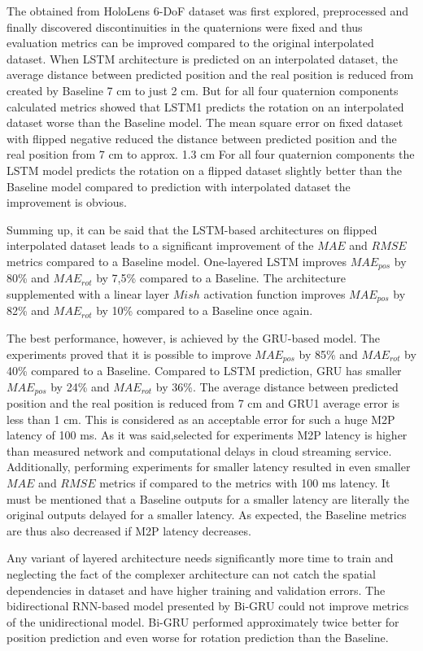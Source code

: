 The obtained from HoloLens 6-DoF dataset was first explored, preprocessed and finally discovered discontinuities in the quaternions were fixed and thus evaluation metrics can be improved compared to the original interpolated dataset. When LSTM architecture is predicted on an interpolated dataset, the average distance between predicted position and the real position is reduced from created by Baseline 7 cm to just 2 cm. But for all four quaternion components calculated metrics showed that LSTM1 predicts the rotation on an interpolated dataset worse than the Baseline model. The mean square error on fixed dataset with flipped negative reduced the distance between predicted position and the real position from 7 cm to approx. 1.3 cm For all four quaternion components the LSTM model predicts the rotation on a flipped dataset slightly better than the Baseline model compared to prediction with interpolated dataset the improvement is obvious. 

Summing up, it can be said that the LSTM-based architectures on flipped interpolated dataset leads to a significant improvement of the $MAE$ and $RMSE$ metrics compared to a Baseline model. One-layered LSTM improves $MAE_{pos}$ by 80\% and  $MAE_{rot}$ by 7,5\% compared to a Baseline. The architecture supplemented with a linear layer $Mish$ activation function improves $MAE_{pos}$ by 82\% and  $MAE_{rot}$ by 10\% compared to a Baseline once again.

The best performance, however, is achieved by the GRU-based model. The experiments proved that it is possible to improve $MAE_{pos}$ by 85\% and  $MAE_{rot}$ by 40\% compared to a Baseline. Compared to LSTM prediction, GRU has smaller $MAE_{pos}$ by 24\% and  $MAE_{rot}$ by 36\%. The average distance between predicted position and the real position is reduced from 7 cm and GRU1 average error is less than 1 cm. This is considered as an acceptable error for such a huge M2P latency of 100 ms. As it was said,selected for experiments M2P latency is higher than measured network and computational delays in cloud streaming service. Additionally, performing experiments for smaller latency resulted in even smaller $MAE$ and $RMSE$ metrics if compared to the metrics with 100 ms latency. It must be mentioned that a Baseline outputs for a smaller latency are literally the original outputs delayed for a smaller latency. As expected, the Baseline metrics are thus also decreased if M2P latency decreases. 

Any variant of layered architecture needs significantly more time to train and neglecting the fact of the complexer architecture can not catch the spatial dependencies in dataset and have higher training and validation errors. The bidirectional RNN-based model presented by Bi-GRU could not improve metrics of the unidirectional model. Bi-GRU performed approximately twice better for position prediction and even worse for rotation prediction than the Baseline.  

